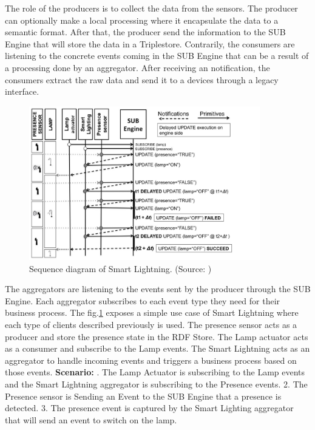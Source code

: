 \documentclass[11pt]{article}
\begin{document}
The role of the producers is to collect the data from the sensors. The producer can optionally make a local processing where it encapsulate the data to a semantic format. After that, the producer send the information to the SUB Engine that will store the data in a Triplestore.
Contrarily, the consumers are listening to the concrete events coming in the SUB Engine that can be a result of a processing done by an aggregator. After receiving an notification, the consumers extract the raw data and send it to a devices through a legacy interface.
\begin{figure}[H]
	\includegraphics[width=\textwidth,height=190pt]{assets/simple_SPS_example.png}
	\caption[Sequence diagram of Smart Lightning]{
	Sequence diagram of Smart Lightning. (Source: \cite{A-Semantic-Publish-Subscribe-Architecture})}
	\label{fig:Sequence-diagram-of-Smart-Lightning}
\end{figure}
The aggregators are listening to the events sent by the producer through the SUB Engine. Each aggregator subscribes to each event type they need for their business process. The fig.\ref{fig:Sequence-diagram-of-Smart-Lightning} exposes a simple use case of Smart Lightning where each type of clients described previously is used. The presence sensor acts as a producer and store the presence state in the RDF Store. The Lamp actuator acts as a consumer and subscribe to the Lamp events. The Smart Lightning acts as an aggregator to handle incoming events and triggers a business process based on those events.
\newline
\newline
\textbf{Scenario:}
. The Lamp Actuator is subscribing to the Lamp events and the Smart Lightning aggregator is subscribing to the Presence events.
2. The Presence sensor is Sending an Event to the SUB Engine that a presence is detected. 
3. The presence event is captured by the Smart Lighting aggregator that will send an event to switch on the lamp. 
\end{document}
